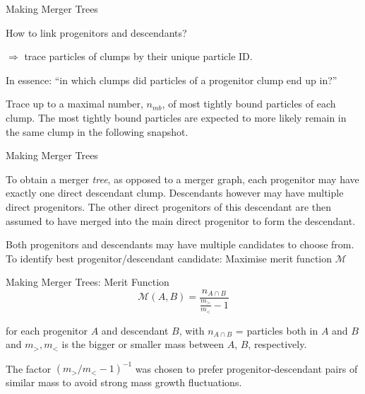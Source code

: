\begin{frame}{Making Merger Trees}
    
    How to link progenitors and descendants? 
    
    $\Rightarrow$ trace particles of clumps by their unique particle ID.
    
    In essence: ``in which clumps did particles of a progenitor clump end up in?''
    
    Trace up to a maximal number, $n_{mb}$, of most tightly bound particles of each clump.
    The most tightly bound particles are expected to more likely remain in the same clump in the following snapshot.
    
\end{frame}


\begin{frame}{Making Merger Trees}
        
    To obtain a merger \emph{tree}, as opposed to a merger graph, each progenitor may have exactly one direct descendant clump. 
    Descendants however may have multiple direct progenitors.
    The other direct progenitors of this descendant are then assumed to have merged into the main direct progenitor to form the descendant.
    
    Both progenitors and descendants may have multiple candidates to choose from.
    To identify best progenitor/descendant candidate: Maximise merit function $\mathcal{M}$

\end{frame}


\begin{frame}{Making Merger Trees: Merit Function}
    \begin{equation}
    \mathcal{M}(A,B) = \frac{n_{A \cap B}}{\frac{m_>}{m_<}-1} \label{eq:merit}
    \end{equation}
    
    for each progenitor $A$ and descendant $B$, with $n_{A \cap B}$ = particles both in $A$ and $B$ and $m_>, m_<$ is the bigger or smaller mass between $A$, $B$, respectively.
    
    The factor $(m_>/m_< - 1) ^{-1}$ was chosen to prefer progenitor-descendant pairs of similar mass to avoid strong mass growth fluctuations.
\end{frame}


